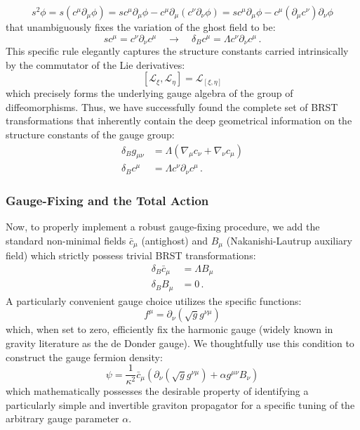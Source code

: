 \[
    s^2\phi = s(c^\mu \partial_\mu \phi) = s c^\mu \partial_\mu \phi - c^\mu \partial_\mu (c^\nu \partial_\nu \phi) = s c^\mu \partial_\mu \phi - c^\mu (\partial_\mu c^\nu)\partial_\nu \phi
\]
that unambiguously fixes the variation of the ghost field to be:
\begin{equation} \label{eq:slavnov_ghost}
    s c^\mu = c^\nu \partial_\nu c^\mu \quad \longrightarrow \quad \delta_B c^\mu = \Lambda c^\nu \partial_\nu c^\mu \, .
\end{equation}
This specific rule elegantly captures the structure constants carried intrinsically by the commutator of the Lie derivatives:
\begin{equation} \label{eq:lie_algebra_diffeo}
    [\mathcal{L}_\xi, \mathcal{L}_\eta] = \mathcal{L}_{[\xi,\eta]}
\end{equation}
which precisely forms the underlying gauge algebra of the group of diffeomorphisms. Thus, we have successfully found the complete set of BRST transformations that inherently contain the deep geometrical information on the structure constants of the gauge group:
\begin{equation} \label{eq:brst_complete_gravity}
    \begin{aligned}
        \delta_B g_{\mu\nu} & = \Lambda(\nabla_\mu c_\nu + \nabla_\nu c_\mu) \\
        \delta_B c^\mu      & = \Lambda c^\nu \partial_\nu c^\mu \, .
    \end{aligned}
\end{equation}

\subsubsection{Gauge-Fixing and the Total Action}

Now, to properly implement a robust gauge-fixing procedure, we add the standard non-minimal fields \(\bar{c}_\mu\) (antighost) and \(B_\mu\) (Nakanishi-Lautrup auxiliary field) which strictly possess trivial BRST transformations:
\[
    \begin{aligned}
        \delta_B \bar{c}_\mu & = \Lambda B_\mu \\
        \delta_B B_\mu       & = 0 \, .
    \end{aligned}
\]
A particularly convenient gauge choice utilizes the specific functions:
\begin{equation} \label{eq:de_donder_gauge}
    f^\mu = \partial_\nu(\sqrt{g} g^{\nu\mu})
\end{equation}
which, when set to zero, efficiently fix the harmonic gauge (widely known in gravity literature as the de Donder gauge). We thoughtfully use this condition to construct the gauge fermion density:
\begin{equation} \label{eq:gauge_fermion_gravity}
    \psi = \frac{1}{\kappa^2} \bar{c}_\mu \left( \partial_\nu(\sqrt{g} g^{\nu\mu}) + \alpha g^{\mu\nu} B_\nu \right)
\end{equation}
which mathematically possesses the desirable property of identifying a particularly simple and invertible graviton propagator for a specific tuning of the arbitrary gauge parameter \(\alpha\).


